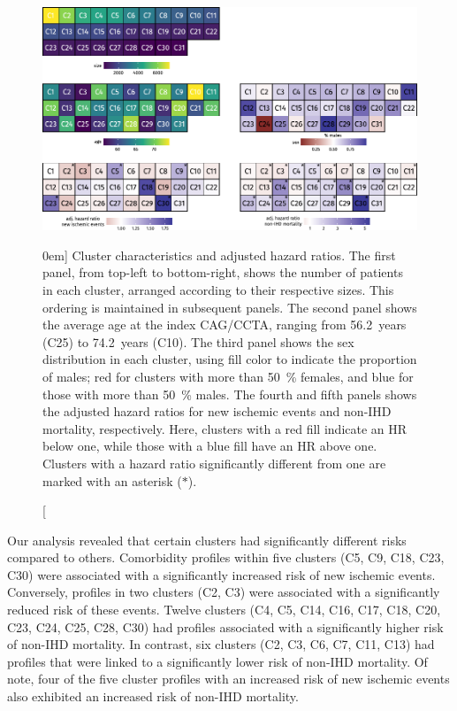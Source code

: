 \begin{figure}[t!]%
    \includegraphics{graphics/clustering-results.pdf}
    \caption[Cluster characteristics and outcomes][0em]{%
        Cluster characteristics and adjusted hazard ratios.
        The first panel,
        from top-left to bottom-right,
        shows the number
        of patients in each cluster, 
        arranged according to their respective sizes.
        This ordering is maintained in subsequent panels.
        The second panel shows the average age at the index \ac{CAG}/\ac{CCTA},
        ranging from \qty{56.2}{years} (C25) to \qty{74.2}{years} (C10).
        The third panel shows the sex distribution in each cluster,
        using fill color to indicate the proportion of males;
        red for clusters with more than \qty{50}{\percent} females,
        and blue for those with more than \qty{50}{\percent} males.
        The fourth and fifth panels shows the adjusted hazard ratios
        for new ischemic events and non-\ac{IHD} mortality, respectively.
        Here, clusters with a red fill indicate an \ac{HR} below one,
        while those with a blue fill have an \ac{HR} above one.
        Clusters with a hazard ratio significantly different from
        one are marked with an asterisk (\(*\)).
    }
    \label{fig:cluster-results}
\end{figure}%

Our analysis revealed that
certain clusters had significantly different risks compared to others.
Comorbidity profiles within five clusters (C5, C9, C18, C23, C30) were
associated with a significantly increased risk of new ischemic events.
Conversely, profiles in two clusters (C2, C3) were associated with a 
significantly reduced risk of these events. 
Twelve clusters (C4, C5, C14, C16, C17, C18, C20, C23, C24, C25,
C28, C30) had profiles associated with a significantly higher risk 
of non-\ac{IHD} mortality. 
In contrast, six clusters (C2, C3, C6, C7, C11, C13) had
profiles that were linked to a significantly lower risk of 
non-\ac{IHD} mortality.
Of note, four of the five cluster profiles with an increased risk of 
new ischemic events also exhibited an increased risk of 
non-\ac{IHD} mortality. 

